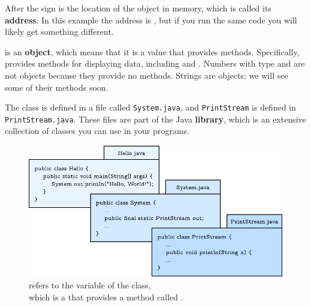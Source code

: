 After the  sign is the
location of the object in memory, which is called its {\bf address}.
In this example the address is , but if you run the same code you will likely get something different.

 is an {\bf object}, which means that it is a value
that provides methods.  Specifically,  provides methods
for displaying data, including  and .
Numbers with type  and  are not objects because
they provide no methods.  Strings are objects; we will see some of their
methods soon.


The  class is defined in a file called {\tt System.java},
and {\tt PrintStream} is defined in {\tt PrintStream.java}.  These
files are part of the Java {\bf library}, which is an extensive collection
of classes you can use in your programs.

\begin{figure}[!h]
\includegraphics{system.pdf}
\caption{ refers to the  variable of the  class,
\\ which is a  that provides a method called .}
\end{figure}

